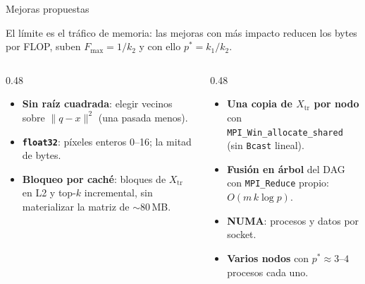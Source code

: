 \documentclass[10pt, aspectratio=169]{beamer}
\newcommand{\cajaInfo}[2]{%
  {\setlength{\fboxsep}{6pt}%
   \colorbox{UTECDarkBlue!5}{\begin{minipage}{\dimexpr#1-2\fboxsep\relax}#2\end{minipage}}}%
}
\newcommand{\cajaAcento}[2]{%
  {\setlength{\fboxsep}{6pt}%
   \colorbox{UTECCyan!10}{\begin{minipage}{\dimexpr#1-2\fboxsep\relax}#2\end{minipage}}}%
}
\newcommand{\encCaja}[1]{\textbf{\color{UTECDarkBlue}{#1}}\par\vspace{0.08cm}}
\newcommand{\Xtr}{X_{\text{tr}}}
\begin{document}
\begin{frame}{Mejoras propuestas}
\footnotesize
\cajaAcento{\linewidth}{%
    El límite es el tráfico de memoria: las mejoras con más impacto reducen los bytes por FLOP, suben
    $F_{\max}=1/k_2$ y con ello $p^*=k_1/k_2$.
}
\vspace{0.12cm}
\begin{columns}[T,onlytextwidth]
    \begin{column}{0.48\textwidth}
        \cajaInfo{\linewidth}{%
            \encCaja{Cómputo local}
            \begin{itemize}
                \item \textbf{Sin raíz cuadrada}: elegir vecinos sobre $\|q-x\|^2$ (una pasada menos).
                \item \textbf{\texttt{float32}}: píxeles enteros 0--16; la mitad de bytes.
                \item \textbf{Bloqueo por caché}: bloques de $\Xtr$ en L2 y top-$k$ incremental, sin
                      materializar la matriz de $\sim$80\,MB.
            \end{itemize}
        }
    \end{column}
    \begin{column}{0.48\textwidth}
        \cajaInfo{\linewidth}{%
            \encCaja{Comunicación y plataforma}
            \begin{itemize}
                \item \textbf{Una copia de $\Xtr$ por nodo} con \texttt{MPI\_Win\_allocate\_shared}
                      (sin \texttt{Bcast} lineal).
                \item \textbf{Fusión en árbol} del DAG con \texttt{MPI\_Reduce} propio:
                      $O(m\,k\log p)$.
                \item \textbf{NUMA}: procesos y datos por socket.
                \item \textbf{Varios nodos} con $p^*\approx3$--$4$ procesos cada uno.
            \end{itemize}
        }
    \end{column}
\end{columns}
\end{frame}
\end{document}
